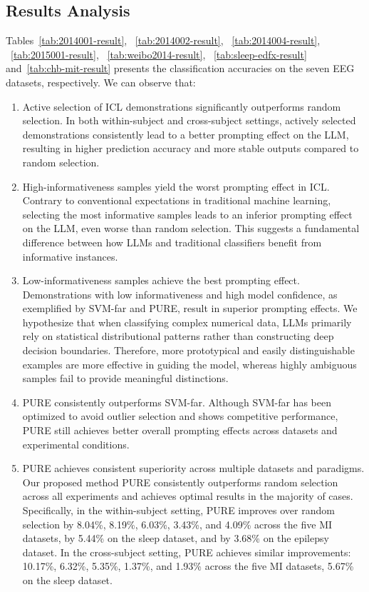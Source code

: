 \documentclass[journal,twocolumn]{IEEEtran}
\begin{document}
\subsection{Results Analysis}
Tables~\ref{tab:2014001-result}, ~\ref{tab:2014002-result}, ~\ref{tab:2014004-result}, ~\ref{tab:2015001-result}, ~\ref{tab:weibo2014-result}, ~\ref{tab:sleep-edfx-result} and~\ref{tab:chb-mit-result} presents the classification accuracies on the seven EEG datasets, respectively. We can observe that:

\begin{enumerate}
  \item {Active selection of ICL demonstrations significantly outperforms random selection.} In both within-subject and cross-subject settings, actively selected demonstrations consistently lead to a better prompting effect on the LLM, resulting in higher prediction accuracy and more stable outputs compared to random selection.
  
  \item {High-informativeness samples yield the worst prompting effect in ICL.} Contrary to conventional expectations in traditional machine learning, selecting the most informative samples leads to an inferior prompting effect on the LLM, even worse than random selection. This suggests a fundamental difference between how LLMs and traditional classifiers benefit from informative instances.
  
  \item {Low-informativeness samples achieve the best prompting effect.} Demonstrations with low informativeness and high model confidence, as exemplified by SVM-far and PURE, result in superior prompting effects. We hypothesize that when classifying complex numerical data, LLMs primarily rely on statistical distributional patterns rather than constructing deep decision boundaries. Therefore, more prototypical and easily distinguishable examples are more effective in guiding the model, whereas highly ambiguous samples fail to provide meaningful distinctions.
  
  \item {PURE consistently outperforms SVM-far.} Although SVM-far has been optimized to avoid outlier selection and shows competitive performance, PURE still achieves better overall prompting effects across datasets and experimental conditions.
  
  \item {PURE achieves consistent superiority across multiple datasets and paradigms.} Our proposed method PURE consistently outperforms random selection across all experiments and achieves optimal results in the majority of cases. Specifically, in the within-subject setting, PURE improves over random selection by 8.04\%, 8.19\%, 6.03\%, 3.43\%, and 4.09\% across the five MI datasets, by 5.44\% on the sleep dataset, and by 3.68\% on the epilepsy dataset. In the cross-subject setting, PURE achieves similar improvements: 10.17\%, 6.32\%, 5.35\%, 1.37\%, and 1.93\% across the five MI datasets, 5.67\% on the sleep dataset.
  

\end{enumerate}
\end{document}

